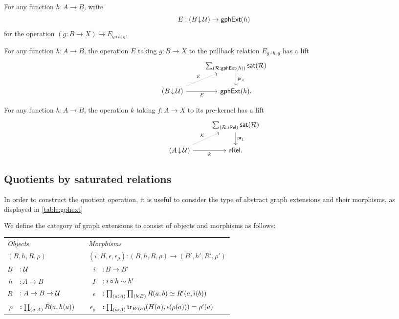 For any function $h:A\to B$, write 
\begin{equation*}
E: (B\,{\downarrow}\,\mathcal{U}) \to \mathsf{gphExt}(h)
\end{equation*}
for the operation $(g:B\to X)\mapsto E_{g\circ h,g}$.

\begin{cor}
For any function $h:A\to B$, the operation $E$ taking $g:B\to X$ to the pullback relation $E_{g\circ h,g}$ has a lift
\begin{equation*}
\begin{tikzcd}
& \sm{\mathcal{R}:\mathsf{gphExt}(h)}\mathsf{sat}(\mathcal{R}) \arrow[d,"\proj 1"] \\
(B\,{\downarrow}\,\UU) \arrow[r,swap,"E"] \arrow[ur,densely dotted,"\mathcal{E}"] & \mathsf{gphExt}(h).
\end{tikzcd}
\end{equation*}
\end{cor}

\begin{cor}
For any function $h:A\to B$, the operation $k$ taking $f:A\to X$ to its pre-kernel has a lift
\begin{equation*}
\begin{tikzcd}
& \sm{\mathcal{R}:\mathsf{rRel}}\mathsf{sat}(\mathcal{R}) \arrow[d,"\proj 1"] \\
(A\,{\downarrow}\,\UU) \arrow[r,swap,"k"] \arrow[ur,densely dotted,"\mathcal{K}"] & \mathsf{rRel}.
\end{tikzcd}
\end{equation*}
\end{cor}

\subsection{Quotients by saturated relations}

In order to construct the quotient operation, it is useful to consider the type of abstract graph extensions and their morphisms, as displayed in \autoref{table:gphext}

\begin{defn}\label{defn:seq_sat}
We define the category of graph extensions to consist of objects and morphisms as follows:
\begin{center}
\begin{tabular}{rlcrl}
\toprule
\multicolumn{2}{l}{\emph{Objects}} & & \multicolumn{2}{l}{\emph{Morphisms}} \\
\multicolumn{2}{l}{$(B,h,R,\rho)$} & & \multicolumn{2}{l}{$(i,H,\epsilon,\epsilon_\rho):(B,h,R,\rho)\to(B',h',R',\rho')$} \\
\midrule
$B$ & $:\mathcal{U}$ & & $i$ & $:B\to B'$\\
$h$ & $:A\to B$ & & $I$ & $:i\circ h\sim h'$ \\
$R$ & $:A\to B\to\mathcal{U}$ & & $\epsilon$ & $: \prd{a:A}{b:B}R(a,b)\eqvsym R'(a,i(b))$ \\
$\rho$ & $: \prd{a:A}R(a,h(a))$ & & $\epsilon_\rho$ & $: \prd{a:A} \mathsf{tr}_{R'(a)}(H(a),\epsilon(\rho(a)))=\rho'(a)$ \\
\bottomrule
\end{tabular}
\end{center}
\end{defn}

